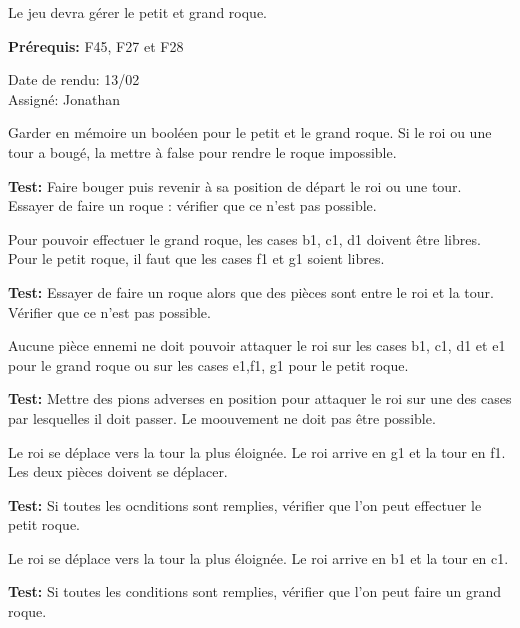 \documentclass{article}
\begin{document}
\begin{needbox}[F30. Roque ]
    Le jeu devra gérer le petit et grand roque.

    \textbf{Prérequis:} F45, F27 et F28
    \begin{duedatebox}
        Date de rendu: 13/02\\
        Assigné: Jonathan
    \end{duedatebox}
    \begin{subneedbox}
        Garder en mémoire un booléen pour le petit et le grand roque.
        Si le roi ou une tour a bougé, la mettre à false pour rendre le roque impossible.

        \textbf{Test:} Faire bouger puis revenir à sa position de départ
         le roi ou une tour. Essayer de faire un roque : vérifier que ce n'est pas possible.
    \end{subneedbox}
    \begin{subneedbox}
        Pour pouvoir effectuer le grand roque, les cases b1, c1, d1 doivent être libres.
        Pour le petit roque, il faut que les cases f1 et g1 soient libres.

        \textbf{Test:} Essayer de faire un roque alors que des pièces sont entre
        le roi et la tour. Vérifier que ce n'est pas possible.
    \end{subneedbox}
    \begin{subneedbox}
        Aucune pièce ennemi ne doit pouvoir attaquer le roi sur les cases b1, c1, d1 
        et e1 pour le grand roque ou sur les cases e1,f1, g1 pour le petit roque.

        \textbf{Test:} Mettre des pions adverses en position pour attaquer le roi sur une des cases
        par lesquelles il doit passer. Le moouvement ne doit pas être possible.
    \end{subneedbox}
    \begin{subneedbox}
        Le roi se déplace vers la tour la plus éloignée. Le roi arrive en g1 et 
        la tour en f1. Les deux pièces doivent se déplacer.

        \textbf{Test:} Si toutes les ocnditions sont remplies, vérifier que l'on
         peut effectuer le petit roque.
    \end{subneedbox}
    \begin{subneedbox}
        Le roi se déplace vers la tour la plus éloignée. Le roi arrive en b1 et la tour en c1.

        \textbf{Test:} Si toutes les conditions sont remplies, vérifier que l'on peut faire
        un grand roque.
    \end{subneedbox}
\end{needbox}
\end{document}
